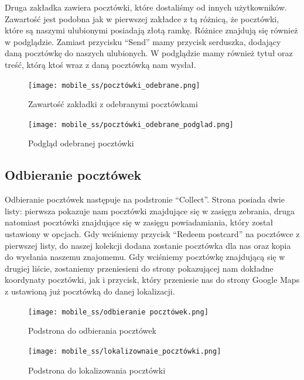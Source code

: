 \documentclass[a4paper,twoside,12pt]{book}
\begin{document}
Druga zakładka zawiera pocztówki, które dostaliśmy od innych użytkowników. Zawartość jest podobna jak w pierwszej zakładce z tą różnicą, że pocztówki, które są naszymi ulubionymi posiadają złotą ramkę. Różnice znajdują się również w podglądzie. Zamiast przycisku ``Send'' mamy przycisk serduszka, dodający daną pocztówkę do naszych ulubionych.  W podglądzie mamy również tytuł oraz treść, którą ktoś wraz z daną pocztówką nam wysłał.

\begin{figure}[H]
  \centering
  \begin{minipage}[b]{0.49\textwidth}
    \texttt{[image: mobile\_ss/pocztówki\_odebrane.png]}
    \caption{Zawartość zakładki z odebranymi pocztówkami}
  \end{minipage}
  \hfill
  \begin{minipage}[b]{0.49\textwidth}
    \texttt{[image: mobile\_ss/pocztówki\_odebrane\_podglad.png]}
    \caption{Podgląd odebranej pocztówki\\}
  \end{minipage}
\end{figure}

\subsection{Odbieranie pocztówek}

Odbieranie pocztówek następuje na podstronie ``Collect''. Strona posiada dwie listy: pierwsza pokazuje nam pocztówki znajdujące się w zasięgu zebrania, druga natomiast pocztówki znajdujące się w zasięgu powiadamiania, który został ustawiony w opcjach. Gdy wciśniemy przycisk ``Redeem postcard'' na pocztówce z pierwszej listy, do naszej kolekcji dodana zostanie pocztówka dla nas oraz kopia do wysłania naszemu znajomemu. Gdy wciśniemy pocztówkę znajdującą się w drugiej liście, zostaniemy przeniesieni do strony pokazującej nam dokładne koordynaty pocztówki, jak i przycisk, który przeniesie nas do strony Google Maps z ustawioną już pocztówką do danej lokalizacji.

\begin{figure}[H]
  \centering
  \begin{minipage}[b]{0.49\textwidth}
    \texttt{[image: mobile\_ss/odbieranie pocztówek.png]}
    \caption{Podstrona do odbierania pocztówek}
  \end{minipage}
  \hfill
  \begin{minipage}[b]{0.49\textwidth}
    \texttt{[image: mobile\_ss/lokalizownaie\_pocztówki.png]}
    \caption{Podstrona do lokalizowania pocztówki}
  \end{minipage}
\end{figure}
\end{document}
